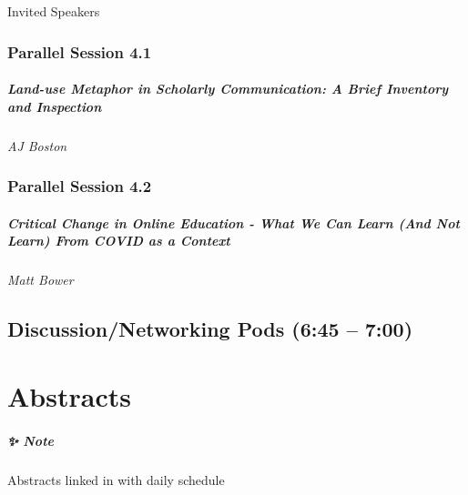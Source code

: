 \documentclass[
]{book}
\begin{document}
Invited Speakers

\hypertarget{parallel-session-4.1}{%
\subsection*{Parallel Session 4.1}\label{parallel-session-4.1}}

\begin{reflect}
\hypertarget{land-use-metaphor-in-scholarly-communication-a-brief-inventory-and-inspection}{%
\paragraph*{Land-use Metaphor in Scholarly Communication: A Brief
Inventory and
Inspection}\label{land-use-metaphor-in-scholarly-communication-a-brief-inventory-and-inspection}}

\emph{AJ Boston}
\end{reflect}

\hypertarget{parallel-session-4.2}{%
\subsection*{Parallel Session 4.2}\label{parallel-session-4.2}}

\begin{reflect}
\hypertarget{critical-change-in-online-education---what-we-can-learn-and-not-learn-from-covid-as-a-context}{%
\paragraph*{Critical Change in Online Education - What We Can Learn (And
Not Learn) From COVID as a
Context}\label{critical-change-in-online-education---what-we-can-learn-and-not-learn-from-covid-as-a-context}}

\emph{Matt Bower}
\end{reflect}

\hypertarget{discussionnetworking-pods-645-700}{%
\section*{Discussion/Networking Pods (6:45 -- 7:00)}\label{discussionnetworking-pods-645-700}}

\hypertarget{abstracts}{%
\chapter{Abstracts}\label{abstracts}}

\begin{todo}
\hypertarget{note}{%
\paragraph*{✨ Note}\label{note}}

Abstracts linked in with daily schedule
\end{todo}

  
\end{document}
